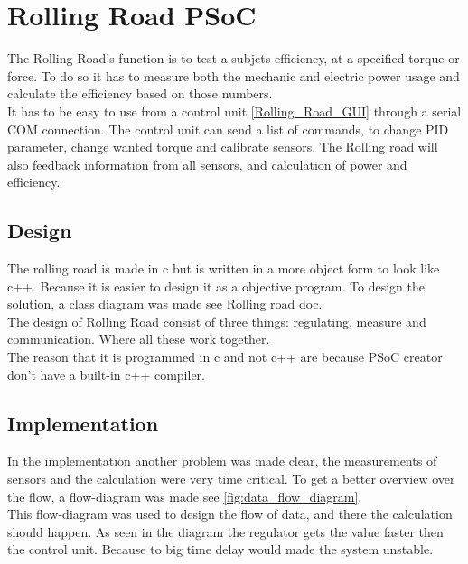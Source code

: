 \section{Rolling Road PSoC}
The Rolling Road's function is to test a subjets efficiency, at a specified torque or force. To do so it has to measure both the mechanic and electric power usage and calculate the efficiency based on those numbers.\\

It has to be easy to use from a control unit \vref{Rolling_Road_GUI} through a serial COM connection. The control unit can send a list of commands, to change PID parameter, change wanted torque and calibrate sensors. The Rolling road will also feedback information from all sensors, and calculation of power and efficiency.\\
\subsection{Design}
The rolling road is made in c but is written in a more object form to look like c++. Because it is easier to design it as a objective program. To design the solution, a class diagram was made see Rolling road doc.\\

The design of Rolling Road consist of three things: regulating, measure and communication. Where all these work together.\\

The reason that it is programmed in c and not c++ are because PSoC creator don't have a built-in c++ compiler. 
\subsection{Implementation}
In the implementation another problem was made clear, the measurements of sensors and the calculation were very time critical. To get a better overview over the flow, a flow-diagram was made see \vref{fig:data_flow_diagram}.\\

This flow-diagram was used to design the flow of data, and there the calculation should happen. As seen in the diagram the regulator gets the value faster then the control unit. Because to big time delay would made the system unstable.\\

